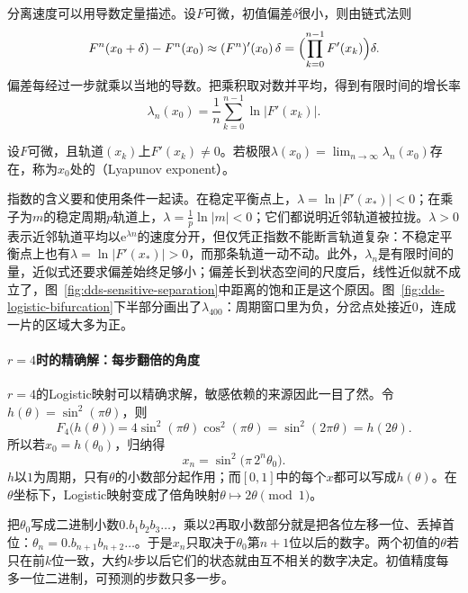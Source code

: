 分离速度可以用导数定量描述。设$F$可微，初值偏差$\delta$很小，则由链式法则
\[
  F^n(x_0+\delta)-F^n(x_0)\approx(F^n)'(x_0)\,\delta=\Bigl(\prod_{k=0}^{n-1}F'(x_k)\Bigr)\delta .
\]
偏差每经过一步就乘以当地的导数。把乘积取对数并平均，得到有限时间的增长率
\begin{equation}
  \lambda_n(x_0)=\frac1n\sum_{k=0}^{n-1}\ln\bigl|F'(x_k)\bigr| .
  \label{eq:dds-finite-lyapunov}
\end{equation}

\begin{definition}[Lyapunov指数]
\label{def:dds-lyapunov-exponent}
设$F$可微，且轨道$(x_k)$上$F'(x_k)\neq0$。若极限$\lambda(x_0)=\lim_{n\to\infty}\lambda_n(x_0)$存在，称为$x_0$处的（Lyapunov exponent）。
\end{definition}

指数的含义要和使用条件一起读。在稳定平衡点上，$\lambda=\ln|F'(x_*)|<0$；在乘子为$m$的稳定周期$p$轨道上，$\lambda=\frac1p\ln|m|<0$；它们都说明近邻轨道被拉拢。$\lambda>0$表示近邻轨道平均以$\mathrm e^{\lambda n}$的速度分开，但仅凭正指数不能断言轨道复杂：不稳定平衡点上也有$\lambda=\ln|F'(x_*)|>0$，而那条轨道一动不动。此外，$\lambda_n$是有限时间的量，近似式还要求偏差始终足够小；偏差长到状态空间的尺度后，线性近似就不成立了，图~\ref{fig:dds-sensitive-separation}中距离的饱和正是这个原因。图~\ref{fig:dds-logistic-bifurcation}下半部分画出了$\lambda_{400}$：周期窗口里为负，分岔点处接近$0$，连成一片的区域大多为正。

\paragraph{$r=4$时的精确解：每步翻倍的角度}
$r=4$的Logistic映射可以精确求解，敏感依赖的来源因此一目了然。令$h(\theta)=\sin^2(\pi\theta)$，则
\[
  F_4\bigl(h(\theta)\bigr)=4\sin^2(\pi\theta)\cos^2(\pi\theta)=\sin^2(2\pi\theta)=h(2\theta).
\]
所以若$x_0=h(\theta_0)$，归纳得
\begin{equation}
  x_n=\sin^2\bigl(\pi\,2^n\theta_0\bigr).
  \label{eq:dds-logistic-exact}
\end{equation}
$h$以$1$为周期，只有$\theta$的小数部分起作用；而$[0,1]$中的每个$x$都可以写成$h(\theta)$。在$\theta$坐标下，Logistic映射变成了倍角映射$\theta\mapsto2\theta\pmod1$。

把$\theta_0$写成二进制小数$0.b_1b_2b_3\ldots$，乘以$2$再取小数部分就是把各位左移一位、丢掉首位：$\theta_n=0.b_{n+1}b_{n+2}\ldots$。于是$x_n$只取决于$\theta_0$第$n+1$位以后的数字。两个初值的$\theta$若只在前$k$位一致，大约$k$步以后它们的状态就由互不相关的数字决定。初值精度每多一位二进制，可预测的步数只多一步。

